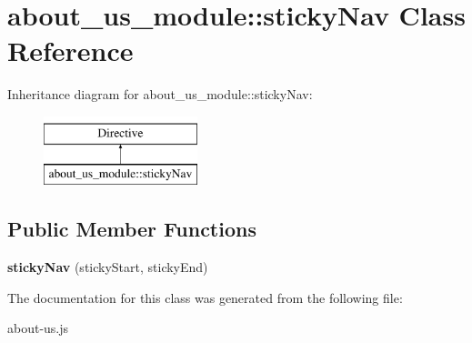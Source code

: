 \hypertarget{classabout__us__module_1_1stickyNav}{\section{about\-\_\-us\-\_\-module\-:\-:sticky\-Nav Class Reference}
\label{classabout__us__module_1_1stickyNav}
}
Inheritance diagram for about\-\_\-us\-\_\-module\-:\-:sticky\-Nav\-:\begin{figure}[H]
\begin{center}
\leavevmode
\includegraphics[height=2.000000cm]{classabout__us__module_1_1stickyNav}
\end{center}
\end{figure}
\subsection*{Public Member Functions}
\begin{DoxyCompactItemize}
\item 
\hypertarget{classabout__us__module_1_1stickyNav_a5c68df5aee987ceed270554d8d62a370}{{\bfseries sticky\-Nav} (sticky\-Start, sticky\-End)}\label{classabout__us__module_1_1stickyNav_a5c68df5aee987ceed270554d8d62a370}

\end{DoxyCompactItemize}


The documentation for this class was generated from the following file\-:\begin{DoxyCompactItemize}
\item 
about-\/us.\-js\end{DoxyCompactItemize}
